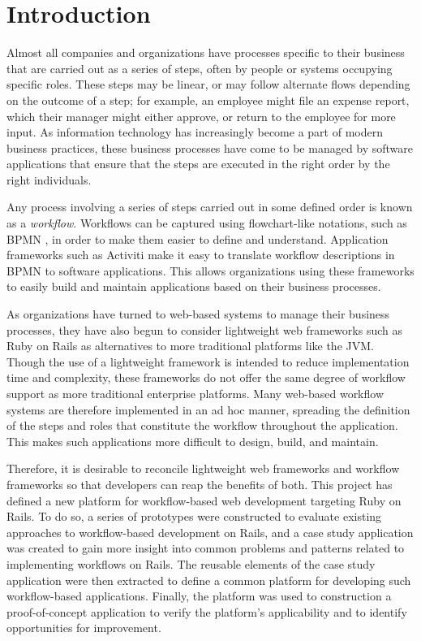 \documentclass[document.tex]{subfiles}
\begin{document}
\chapter{Introduction}

Almost all companies and organizations have processes specific to their business that are carried out as a series of steps, often by people or systems occupying specific roles.
These steps may be linear, or may follow alternate flows depending on the outcome of a step; for example, an employee might file an expense report, which their manager might either approve, or return to the employee for more input.
As information technology has increasingly become a part of modern business practices, these business processes have come to be managed by software applications that ensure that the steps are executed in the right order by the right individuals.

Any process involving a series of steps carried out in some defined order is known as a \emph{workflow}.
Workflows can be captured using flowchart-like notations, such as BPMN \cite{bpmn}, in order to make them easier to define and understand.
Application frameworks such as Activiti \cite{activiti} make it easy to translate workflow descriptions in BPMN to software applications.
This allows organizations using these frameworks to easily build and maintain applications based on their business processes.

As organizations have turned to web-based systems to manage their business processes, they have also begun to consider lightweight web frameworks such as Ruby on Rails \cite{rails} as alternatives to more traditional platforms like the JVM.
Though the use of a lightweight framework is intended to reduce implementation time and complexity, these frameworks do not offer the same degree of workflow support as more traditional enterprise platforms.
Many web-based workflow systems are therefore implemented in an ad hoc manner, spreading the definition of the steps and roles that constitute the workflow throughout the application.
This makes such applications more difficult to design, build, and maintain.

Therefore, it is desirable to reconcile lightweight web frameworks and workflow frameworks so that developers can reap the benefits of both. This project has defined a new platform for workflow-based web development targeting Ruby on Rails. To do so, a series of prototypes were constructed to evaluate existing approaches to workflow-based development on Rails, and a case study application was created to gain more insight into common problems and patterns related to implementing workflows on Rails. The reusable elements of the case study application were then extracted to define a common platform for developing such workflow-based applications. Finally, the platform was used to construction a proof-of-concept application to verify the platform's applicability and to identify opportunities for improvement.
\end{document}

